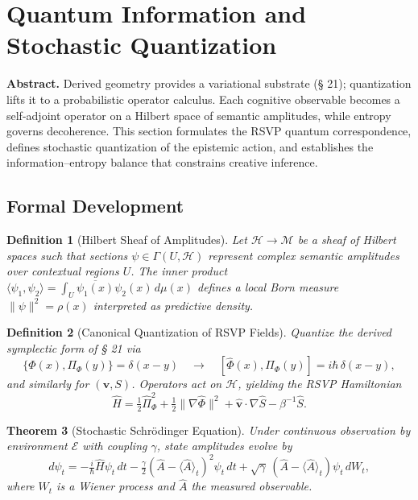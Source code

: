 \documentclass[12pt,a4paper,twoside,openright]{book}
\newtheorem{theorem}{Theorem}
\newtheorem{definition}[theorem]{Definition}
\begin{document}
\section{Quantum Information and Stochastic Quantization}
\label{sec:quantum}

\textbf{Abstract.}
Derived geometry provides a variational substrate (§ 21); quantization lifts it to a probabilistic operator calculus.  
Each cognitive observable becomes a self-adjoint operator on a Hilbert space of semantic amplitudes, while entropy governs decoherence.  
This section formulates the RSVP quantum correspondence, defines stochastic quantization of the epistemic action, and establishes the information–entropy balance that constrains creative inference.

\subsection*{Formal Development}

\begin{definition}[Hilbert Sheaf of Amplitudes]
Let $\mathcal{H}\to\mathcal{M}$ be a sheaf of Hilbert spaces such that
sections $\psi\in\Gamma(U,\mathcal{H})$ represent complex semantic amplitudes
over contextual regions $U$.  
The inner product
\(
\langle \psi_1,\psi_2\rangle
  = \int_U \overline{\psi_1(x)}\psi_2(x)\,d\mu(x)
\)
defines a local Born measure $\|\psi\|^2=\rho(x)$ interpreted as predictive density.
\end{definition}

\begin{definition}[Canonical Quantization of RSVP Fields]
Quantize the derived symplectic form of § 21 via
\[
\{\Phi(x),\Pi_\Phi(y)\} = \delta(x-y)
\quad\longrightarrow\quad
[\hat{\Phi}(x),\hat{\Pi}_\Phi(y)] = i\hbar\,\delta(x-y),
\]
and similarly for $(\mathbf{v},S)$.  
Operators act on $\mathcal{H}$, yielding the RSVP Hamiltonian
\[
\hat{H}
 = \tfrac{1}{2}\hat{\Pi}_\Phi^2
 + \tfrac{1}{2}\|\nabla\hat{\Phi}\|^2
 + \hat{\mathbf{v}}\!\cdot\!\nabla\hat{S}
 - \beta^{-1}\hat{S}.
\]
\end{definition}

\begin{theorem}[Stochastic Schrödinger Equation]
\label{thm:stochSE}
Under continuous observation by environment $\mathcal{E}$ with coupling $\gamma$,
state amplitudes evolve by
\[
d\psi_t
 = -\tfrac{i}{\hbar}\hat{H}\psi_t\,dt
   -\tfrac{\gamma}{2}(\hat{A}-\langle\hat{A}\rangle_t)^2\psi_t\,dt
   +\sqrt{\gamma}\,(\hat{A}-\langle\hat{A}\rangle_t)\psi_t\,dW_t,
\]
where $W_t$ is a Wiener process and $\hat{A}$ the measured observable.
\end{theorem}
\end{document}
